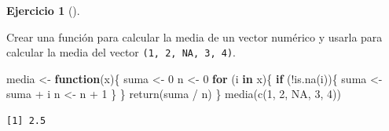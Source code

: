 \documentclass[
  spanish,
  a4paper,
]{scrreport}
\newenvironment{Shaded}{\begin{snugshade}}{\end{snugshade}}
\newcommand{\ConstantTok}[1]{\textcolor[rgb]{0.56,0.35,0.01}{#1}}
\newcommand{\ControlFlowTok}[1]{\textcolor[rgb]{0.00,0.23,0.31}{\textbf{#1}}}
\newcommand{\DecValTok}[1]{\textcolor[rgb]{0.68,0.00,0.00}{#1}}
\newcommand{\FunctionTok}[1]{\textcolor[rgb]{0.28,0.35,0.67}{#1}}
\newcommand{\NormalTok}[1]{\textcolor[rgb]{0.00,0.23,0.31}{#1}}
\newcommand{\OtherTok}[1]{\textcolor[rgb]{0.00,0.23,0.31}{#1}}
\newcommand{\SpecialCharTok}[1]{\textcolor[rgb]{0.37,0.37,0.37}{#1}}
\theoremstyle{definition}
\newtheorem{exercise}{Ejercicio}[chapter]
\theoremstyle{definition}
\theoremstyle{remark}
\begin{document}
\begin{exercise}[]\protect\hypertarget{exr-funciones-1}{}\label{exr-funciones-1}

Crear una función para calcular la media de un vector numérico y usarla
para calcular la media del vector \texttt{(1,\ 2,\ NA,\ 3,\ 4)}.

\begin{tcolorbox}[enhanced jigsaw, arc=.35mm, bottomrule=.15mm, bottomtitle=1mm, breakable, colback=white, colbacktitle=quarto-callout-note-color!10!white, colframe=quarto-callout-note-color-frame, coltitle=black, left=2mm, leftrule=.75mm, opacityback=0, opacitybacktitle=0.6, rightrule=.15mm, title=\textcolor{quarto-callout-note-color}{\faInfo}\hspace{0.5em}{Solución}, titlerule=0mm, toprule=.15mm, toptitle=1mm]

\begin{Shaded}
\begin{Highlighting}[]
\NormalTok{media }\OtherTok{\textless{}{-}} \ControlFlowTok{function}\NormalTok{(x)\{}
\NormalTok{  suma }\OtherTok{\textless{}{-}} \DecValTok{0}
\NormalTok{  n }\OtherTok{\textless{}{-}} \DecValTok{0}
  \ControlFlowTok{for}\NormalTok{ (i }\ControlFlowTok{in}\NormalTok{ x)\{}
    \ControlFlowTok{if}\NormalTok{ (}\SpecialCharTok{!}\FunctionTok{is.na}\NormalTok{(i))\{}
\NormalTok{      suma }\OtherTok{\textless{}{-}}\NormalTok{ suma }\SpecialCharTok{+}\NormalTok{ i}
\NormalTok{      n }\OtherTok{\textless{}{-}}\NormalTok{ n }\SpecialCharTok{+} \DecValTok{1}
\NormalTok{    \}}
\NormalTok{  \}}
  \FunctionTok{return}\NormalTok{(suma }\SpecialCharTok{/}\NormalTok{ n)}
\NormalTok{\}}
\FunctionTok{media}\NormalTok{(}\FunctionTok{c}\NormalTok{(}\DecValTok{1}\NormalTok{, }\DecValTok{2}\NormalTok{, }\ConstantTok{NA}\NormalTok{, }\DecValTok{3}\NormalTok{, }\DecValTok{4}\NormalTok{))}
\end{Highlighting}
\end{Shaded}

\begin{verbatim}
[1] 2.5
\end{verbatim}

\end{tcolorbox}

\end{exercise}
\end{document}
